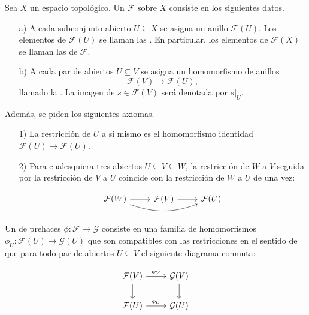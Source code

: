 \documentclass{article}
\numberwithin{equation}{section}
\theoremstyle{definition}
\begin{document}
\begin{definicion}
  \label{dfn:prehaces}
  Sea $X$ un espacio topológico. Un  $\mathcal{F}$ sobre
  $X$ consiste en los siguientes datos.

  \begin{enumerate}
  \item[a)] A cada subconjunto abierto $U \subseteq X$ se asigna un anillo
    $\mathcal{F} (U)$. Los elementos de $\mathcal{F} (U)$ se llaman
    las . En particular,
    los elementos de $\mathcal{F} (X)$ se llaman las 
    de $\mathcal{F}$.

  \item[b)] A cada par de abiertos $U \subseteq V$ se asigna un homomorfismo
    de anillos
    $$\mathcal{F} (V) \to \mathcal{F} (U),$$
    llamado la . La imagen de
    $s \in \mathcal{F} (V)$ será denotada por $\left.s\right|_U$.
  \end{enumerate}

  Además, se piden los siguientes axiomas.

  \begin{enumerate}
  \item[1)] La restricción de $U$ a sí mismo es el homomorfismo identidad
    $\mathcal{F} (U) \to \mathcal{F} (U)$.

  \item[2)] Para cualesquiera tres abiertos $U \subseteq V \subseteq W$,
    la restricción de $W$ a $V$ seguida por la restricción de $V$ a $U$ coincide
    con la restricción de $W$ a $U$ de una vez:

    \[ \begin{tikzcd}
        \mathcal{F} (W) \ar{r}\ar[bend right=20]{rr} & \mathcal{F} (V) \ar{r} & \mathcal{F} (U)
      \end{tikzcd} \]
  \end{enumerate}

  Un  de prehaces $\phi\colon \mathcal{F} \to \mathcal{G}$
  consiste en una familia de homomorfismos
  $\phi_U\colon \mathcal{F} (U) \to \mathcal{G} (U)$ que son compatibles con
  las restricciones en el sentido de que para todo par de abiertos
  $U \subseteq V$ el siguiente diagrama conmuta:

  \[ \begin{tikzcd}
      \mathcal{F} (V) \ar{r}{\phi_V}\ar{d} & \mathcal{G} (V)\ar{d} \\
      \mathcal{F} (U) \ar{r}{\phi_U} & \mathcal{G} (U)
    \end{tikzcd} \]
\end{definicion}
\end{document}
